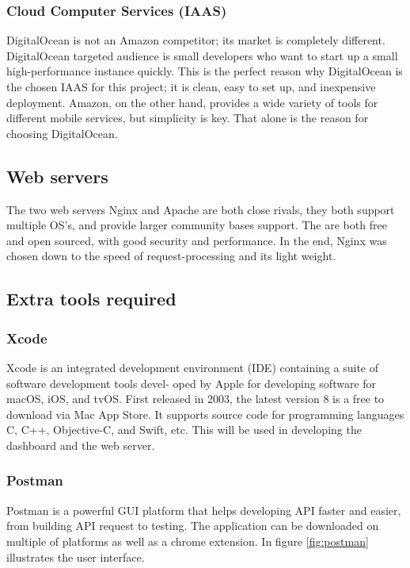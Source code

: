 \subsubsection{Cloud Computer Services (IAAS)}
DigitalOcean is not an Amazon competitor; its market is completely different. DigitalOcean targeted audience is small developers who want to start up a small high-performance instance \cite{iaas} quickly. This is the perfect reason why DigitalOcean is the chosen IAAS for this project; it is clean, easy to set up, and inexpensive deployment. Amazon, on the other hand, provides a wide variety of tools for different mobile services, but simplicity is key. That alone is the reason for choosing DigitalOcean.

\subsection{Web servers}
The two web servers Nginx and Apache are both close rivals, they both support multiple OS's, and provide larger community bases support. The are both free and open sourced, with good security and performance. In the end, Nginx was chosen down to the speed of request-processing and its light weight. \cite{server_choice}

\subsection{Extra tools required}

\subsubsection{Xcode}

Xcode \cite{xcode} is an integrated development environment (IDE) containing a suite of software development tools devel- oped by Apple for developing software for macOS, iOS, and tvOS. First released in 2003, the latest version 8 is a free to download via Mac App Store. It supports source code for programming languages C, C++, Objective-C, and Swift, etc. This will be used in developing the dashboard and the web server.

\subsubsection{Postman}

Postman \cite{postman} is a powerful GUI platform that helps developing API faster and easier, from building API request to testing. The application can be downloaded on multiple of platforms as well as a chrome extension. In figure \ref{fig:postman} illustrates the user interface. 


